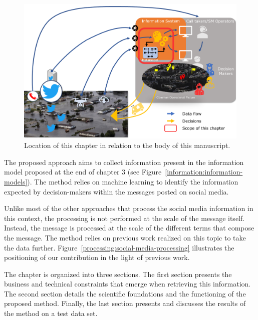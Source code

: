 \begin{figure}[htb]
    \centering
    \includegraphics[width=\textwidth]{figures/chap-4/position-chapter.pdf}
    \caption{Location of this chapter in relation to the body of this manuscript.}
    \label{processing:big-picture-manuscrit}
\end{figure}

The proposed approach aims to collect information present in the information model proposed at the end of chapter 3 (see Figure~\ref{information:information-models}).
The method relies on machine learning to identify the information expected by decision-makers within the messages posted on social media.

Unlike most of the other approaches that process the social media information in this context, the processing is not performed at the scale of the message itself.
Instead, the message is processed at the scale of the different terms that compose the message.
The method relies on previous work realized on this topic to take the data further.
Figure~\ref{processing:social-media-processing} illustrates the positioning of our contribution in the light of previous work.

The chapter is organized into three sections.
The first section presents the business and technical constraints that emerge when retrieving this information.
The second section details the scientific foundations and the functioning of the proposed method.
Finally, the last section presents and discusses the results of the method on a test data set.

